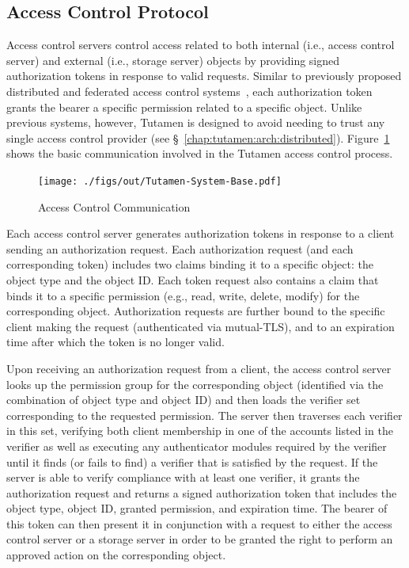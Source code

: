 \subsection{Access Control Protocol}
\label{chap:tutamen:arch:acp}

Access control servers control access related to both internal (i.e.,
access control server) and external (i.e., storage server) objects by
providing signed authorization tokens in response to valid
requests. Similar to previously proposed distributed and federated
access control systems~\cite{Calero2010, Leandro2012}, each
authorization token grants the bearer a specific permission related to
a specific object. Unlike previous systems, however, Tutamen is
designed to avoid needing to trust any single access control provider
(see \S~\ref{chap:tutamen:arch:distributed}).
Figure~\ref{fig:tutamen:systembase} shows the basic communication
involved in the Tutamen access control process.

\begin{figure}[t]
  \centering
  \texttt{[image: ./figs/out/Tutamen-System-Base.pdf]}
  \caption{Access Control Communication}
  \label{fig:tutamen:systembase}
\end{figure}

Each access control server generates authorization tokens in response
to a client sending an authorization request. Each authorization
request (and each corresponding token) includes two claims binding it
to a specific object: the object type and the object ID. Each token
request also contains a claim that binds it to a specific permission
(e.g., read, write, delete, modify) for the corresponding
object. Authorization requests are further bound to the specific
client making the request (authenticated via mutual-TLS), and to an
expiration time after which the token is no longer valid.

Upon receiving an authorization request from a client, the access
control server looks up the permission group for the corresponding
object (identified via the combination of object type and object ID)
and then loads the verifier set corresponding to the requested
permission. The server then traverses each verifier in this set,
verifying both client membership in one of the accounts listed in the
verifier as well as executing any authenticator modules required by
the verifier until it finds (or fails to find) a verifier that is
satisfied by the request. If the server is able to verify compliance
with at least one verifier, it grants the authorization request and
returns a signed authorization token that includes the object type,
object ID, granted permission, and expiration time. The bearer of this
token can then present it in conjunction with a request to either the
access control server or a storage server in order to be granted the
right to perform an approved action on the corresponding object.

